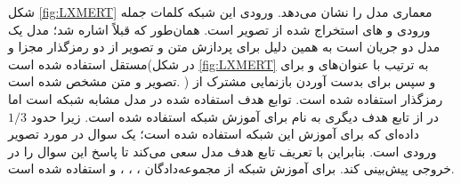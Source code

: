 	شکل 
	\ref{fig:LXMERT}
	معماری مدل
	را نشان می‌دهد. ورودی این شبکه کلمات جمله ورودی و 
	های استخراج شده از تصویر است. همان‌طور که قبلاً اشاره شد؛ مدل
	یک مدل دو جریان است به همین دلیل برای پردازش متن و تصویر از دو رمزگذار مجزا و مستقل استفاده شده است(در شکل 
	\ref{fig:LXMERT}
	به ترتیب با عنوان‌های  
	و 
	برای تصویر و متن مشخص شده است.
	) و سپس برای بدست آوردن بازنمایی مشترک از رمزگذار
	استفاده شده است. توابع هدف استفاده شده در مدل
	مشابه شبکه 
	است اما در 
	از تابع هدف دیگری به نام 
	برای آموزش شبکه استفاده شده است. زیرا حدود $1/3$ داده‌ای که برای آموزش این شبکه استفاده شده است؛ یک سوال در مورد تصویر ورودی است. بنابراین با تعریف تابع هدف 
	مدل سعی ‌می‌کند تا پاسخ این سوال را در خروجی پیش‌بینی کند. برای آموزش شبکه
	از مجموعه‌دادگان 
	،
	،
	،
	و
	استفاده شده است.
